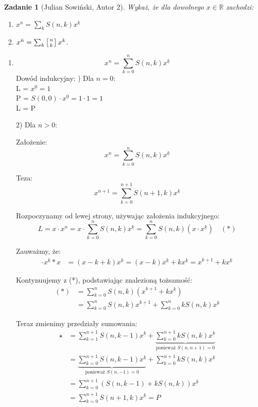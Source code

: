 \documentclass{mwart}
\newtheorem{zad}{Zadanie}[section]
\begin{document}
\begin{zad}[Julian Sowiński, Autor 2]
    Wykaż, że dla dowolnego $x \in \mathbb{R}$ zachodzi:
    \begin{enumerate}
        \item $x^n = \sum_{k}S(n,k) x^{\underline{k}}$
        \item $x^{\bar{n}} = \sum_{k} \left[n \atop k \right] x^k$.
    \end{enumerate}
\end{zad}
\begin{mdframed}
    \begin{enumerate}
\item
$$x^n = \sum_{k=0}^n S(n,k) x^{\underline{k}}$$
Dowód indukcyjny:
\newline {}) Dla $n=0$: \\
L = $x^{\underline{0}} = 1$ \\
P = $S(0,0) \cdot x^{\underline{0}} = 1 \cdot 1 = 1$ \\
L = P

2) Dla $n>0$:

Założenie: $$x^n = \sum_{k=0}^n S(n,k) x^{\underline{k}}$$

Teza: $$x^{n+1} = \sum_{k=0}^{n+1} S(n+1,k) x^{\underline{k}}$$

Rozpoczynamy od lewej strony, używając założenia indukcyjnego:
$$L = x \cdot x^n = x \cdot \sum_{k=0}^n S(n,k) x^{\underline{k}} = \sum_{k=0}^n S(n,k) (x \cdot x^{\underline{k}}) \quad (*)$$

Zauważmy, że:
\begin{align*}
    \cdot x^{\underline{k}}*x &= (x-k+k) x^{\underline{k}} = (x-k) x^{\underline{k}} + k x^{\underline{k}} = x^{\underline{k+1}} + k x^{\underline{k}}
\end{align*}

Kontynuujemy z (*), podstawiając znalezioną tożsamość:
\begin{align*}
    (*) &= \sum_{k=0}^n S(n,k) (x^{\underline{k+1}} + k x^{\underline{k}}) \\
    &= \sum_{k=0}^n S(n,k) x^{\underline{k+1}} + \sum_{k=0}^n k S(n,k) x^{\underline{k}}
\end{align*}

Teraz zmienimy przedziały sumowania:
\begin{align*}
 \star &= \sum_{k=1}^{n+1} S(n,k-1) x^{\underline{k}} + \underbrace{\sum_{k=0}^{n+1} k S(n,k) x^{\underline{k}}}_{\text{ponieważ } S(n,n+1)=0} \\
       &= \underbrace{\sum_{k=0}^{n+1} S(n,k-1) x^{\underline{k}}}_{\text{ponieważ } S(n,-1)=0} + \sum_{k=0}^{n+1} k S(n,k) x^{\underline{k}} \\
       &= \sum_{k=0}^{n+1} (S(n,k-1) + k S(n,k)) x^{\underline{k}} \\
       &= \sum_{k=0}^{n+1} S(n+1,k) x^{\underline{k}} = P
\end{align*}


\end{enumerate}
\end{mdframed}
\end{document}
